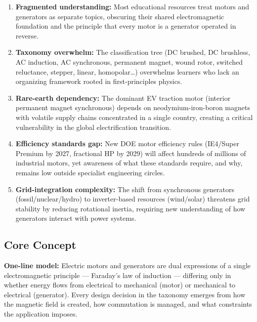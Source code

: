 \documentclass[11pt,letterpaper]{article}
\begin{document}
\begin{enumerate}[leftmargin=2em]
\item \textbf{Fragmented understanding:} Most educational resources treat motors and generators as separate topics, obscuring their shared electromagnetic foundation and the principle that every motor is a generator operated in reverse.

\item \textbf{Taxonomy overwhelm:} The classification tree (DC brushed, DC brushless, AC induction, AC synchronous, permanent magnet, wound rotor, switched reluctance, stepper, linear, homopolar\ldots) overwhelms learners who lack an organizing framework rooted in first-principles physics.

\item \textbf{Rare-earth dependency:} The dominant EV traction motor (interior permanent magnet synchronous) depends on neodymium-iron-boron magnets with volatile supply chains concentrated in a single country, creating a critical vulnerability in the global electrification transition.

\item \textbf{Efficiency standards gap:} New DOE motor efficiency rules (IE4/Super Premium by 2027, fractional HP by 2029) will affect hundreds of millions of industrial motors, yet awareness of what these standards require, and why, remains low outside specialist engineering circles.

\item \textbf{Grid-integration complexity:} The shift from synchronous generators (fossil/nuclear/hydro) to inverter-based resources (wind/solar) threatens grid stability by reducing rotational inertia, requiring new understanding of how generators interact with power systems.
\end{enumerate}

\subsection{Core Concept}

\begin{quotebox}
\textbf{One-line model:} Electric motors and generators are dual expressions of a single electromagnetic principle --- Faraday's law of induction --- differing only in whether energy flows from electrical to mechanical (motor) or mechanical to electrical (generator). Every design decision in the taxonomy emerges from how the magnetic field is created, how commutation is managed, and what constraints the application imposes.
\end{quotebox}
\end{document}
